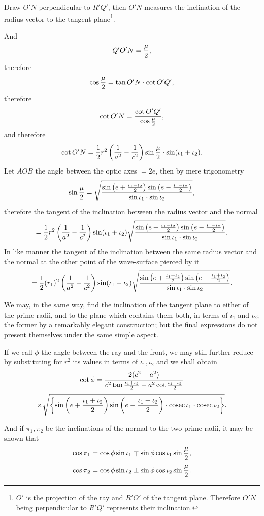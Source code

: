 \documentclass[11pt]{article}
\newcommand{\sourcepage}[1]{\marginpar{\scriptsize p.~#1}}
\newcommand{\cosec}{\operatorname{cosec}}
\begin{document}
\sourcepage{17}
Draw $O'N$ perpendicular to $R'Q'$, then $O'N$ measures the inclination of the radius vector to the tangent plane\footnote{$O'$ is the projection of the ray and $R'O'$ of the tangent plane. Therefore $O'N$ being perpendicular to $R'Q'$ represents their inclination.}.

And
\[
 Q'O'N={\mu\over2},
\]
therefore
\[
 \cos{\mu\over2}=\tan O'N\cdot \cot O'Q',
\]
therefore
\[
 \cot O'N={\cot O'Q'\over \cos{\mu\over2}},
\]
and therefore
\[
 \cot O'N={1\over2}r^2\left({1\over a^2}-{1\over c^2}\right)
 \sin{\mu\over2}\cdot \sin(\iota_1+\iota_2).
\]
Let $AOB$ the angle between the optic axes $=2e$, then by mere trigonometry
\[
 \sin{\mu\over2}=\sqrt{\frac{
 \sin\left(e+{\iota_1-\iota_2\over2}\right)
 \sin\left(e-{\iota_1-\iota_2\over2}\right)}
 {\sin\iota_1\cdot\sin\iota_2}},
\]
therefore the tangent of the inclination between the radius vector and the normal
\[
 ={1\over2}r^2\left({1\over a^2}-{1\over c^2}\right)\sin(\iota_1+\iota_2)
 \sqrt{\frac{
 \sin\left(e+{\iota_1-\iota_2\over2}\right)
 \sin\left(e-{\iota_1-\iota_2\over2}\right)}
 {\sin\iota_1\cdot\sin\iota_2}}.
\]
In like manner the tangent of the inclination between the same radius vector and the normal at the other point of the wave-surface pierced by it
\[
 ={1\over2}(r_1)^2\left({1\over a^2}-{1\over c^2}\right)\sin(\iota_1-\iota_2)
 \sqrt{\frac{
 \sin\left(e+{\iota_1+\iota_2\over2}\right)
 \sin\left(e-{\iota_1+\iota_2\over2}\right)}
 {\sin\iota_1\cdot\sin\iota_2}}.
\]

We may, in the same way, find the inclination of the tangent plane to either of the prime radii, and to the plane which contains them both, in terms of $\iota_1$ and $\iota_2$; the former by a remarkably elegant construction; but the final expressions do not present themselves under the same simple aspect.

If we call $\phi$ the angle between the ray and the front, we may still further reduce by substituting for $r^2$ its values in terms of $\iota_1,\iota_2$ and we shall obtain
\[
 \cot\phi=\frac{2(c^2-a^2)}{c^2\tan{\iota_1+\iota_2\over2}+a^2\cot{\iota_1+\iota_2\over2}}
\]
\[
 \times \sqrt{\left\{\sin\left(e+{\iota_1+\iota_2\over2}\right)
 \sin\left(e-{\iota_1+\iota_2\over2}\right)\cdot\cosec\iota_1\cdot\cosec\iota_2\right\}}.
\]

\sourcepage{18}
And if $\pi_1,\pi_2$ be the inclinations of the normal to the two prime radii, it may be shown that
\[
 \cos\pi_1=\cos\phi\sin\iota_1\mp\sin\phi\cos\iota_1\sin{\mu\over2},
\]
\[
 \cos\pi_2=\cos\phi\sin\iota_2\pm\sin\phi\cos\iota_2\sin{\mu\over2}.
\]
\end{document}
